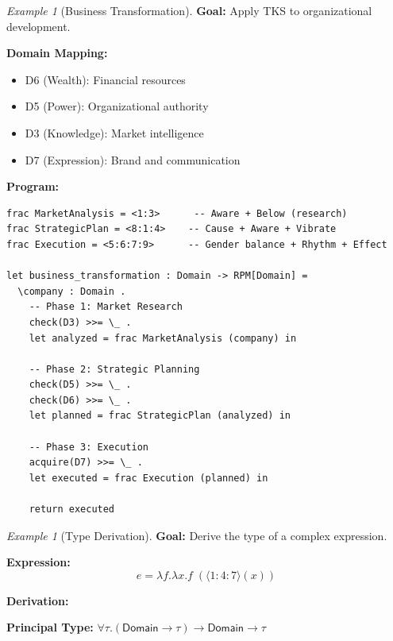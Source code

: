\documentclass[11pt,twoside,openright]{book}
\theoremstyle{definition}
\theoremstyle{plain}
\theoremstyle{remark}
\newtheorem{example}[definition]{Example}
\begin{document}
\begin{example}[Business Transformation]
\label{ex:business-transformation}
\textbf{Goal:} Apply TKS to organizational development.

\textbf{Domain Mapping:}
\begin{itemize}
\item D6 (Wealth): Financial resources
\item D5 (Power): Organizational authority
\item D3 (Knowledge): Market intelligence
\item D7 (Expression): Brand and communication
\end{itemize}

\textbf{Program:}
\begin{verbatim}
frac MarketAnalysis = <1:3>      -- Aware + Below (research)
frac StrategicPlan = <8:1:4>    -- Cause + Aware + Vibrate
frac Execution = <5:6:7:9>      -- Gender balance + Rhythm + Effect

let business_transformation : Domain -> RPM[Domain] =
  \company : Domain .
    -- Phase 1: Market Research
    check(D3) >>= \_ .
    let analyzed = frac MarketAnalysis (company) in

    -- Phase 2: Strategic Planning
    check(D5) >>= \_ .
    check(D6) >>= \_ .
    let planned = frac StrategicPlan (analyzed) in

    -- Phase 3: Execution
    acquire(D7) >>= \_ .
    let executed = frac Execution (planned) in

    return executed
\end{verbatim}
\end{example}

\begin{example}[Type Derivation]
\label{ex:type-derivation}
\textbf{Goal:} Derive the type of a complex expression.

\textbf{Expression:}
\[
e = \lambda f. \lambda x. f\; (\langle 1:4:7 \rangle(x))
\]

\textbf{Derivation:}
\begin{prooftree}
\end{prooftree}

\textbf{Principal Type:} $\forall \tau. (\mathsf{Domain} \to \tau) \to \mathsf{Domain} \to \tau$
\end{example}
\end{document}
